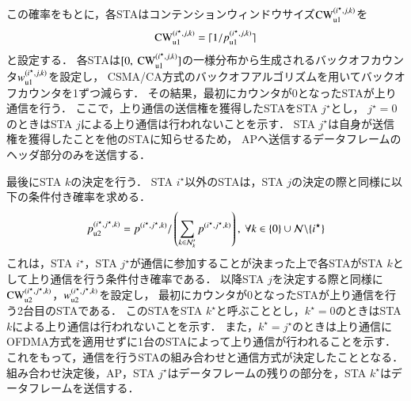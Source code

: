 \documentclass[master]{kuisthesis}		%
\newcommand{\mthnk}{{\mathcal N}'_k}
\begin{document}
			この確率をもとに，各STAはコンテンションウィンドウサイズ${\rm CW}^{(i^{\star},j,k)}_{\rm u1}$を
			\begin{equation}
				{\rm CW}^{(i^{\star},j,k)}_{\rm u1} = \lceil 1/p_{\rm u1}^{(i^{\star},j,k)} \rceil
			\end{equation}
			と設定する．
			各STAは$[0,\ {\rm CW}^{(i^{\star},j,k)}_{\rm u1}]$の一様分布から生成されるバックオフカウンタ$w_{\rm u1}^{(i^{\star},j,k)}$を設定し，
			CSMA/CA方式のバックオフアルゴリズムを用いてバックオフカウンタを1ずつ減らす．
			その結果，最初にカウンタが0となったSTAが上り通信を行う．
			ここで，上り通信の送信権を獲得したSTAをSTA $j^{\star}$とし，
			$j^{\star}=0$のときはSTA $j$による上り通信は行われないことを示す．
			STA $j^{\star}$は自身が送信権を獲得したことを他のSTAに知らせるため，
			APへ送信するデータフレームのヘッダ部分のみを送信する．
			\par
			最後にSTA $k$の決定を行う．
			STA $i^{\star}$以外のSTAは，STA $j$の決定の際と同様に以下の条件付き確率を求める．
			\begin{align}
				p_{\rm u2}^{(i^{\star},j^{\star},k)}=p^{(i^{\star},j^{\star},k)} / \left(\sum_{k\in\mthnk} p^{(i^{\star},j^{\star},k)}\right),\ \forall k \in \{0\}\cup{\mathcal N}\backslash \{i^{\star}\}
			\end{align}
			これは，STA $i^{\star}$，STA $j^{\star}$が通信に参加することが決まった上で各STAがSTA $k$として上り通信を行う条件付き確率である．
			以降STA $j$を決定する際と同様に${\rm CW}^{(i^{\star},j^{\star},k)}_{\rm u2}$，$w_{\rm u2}^{(i^{\star},j^{\star},k)}$を設定し，
			最初にカウンタが0となったSTAが上り通信を行う2台目のSTAである．
			このSTAをSTA $k^{\star}$と呼ぶこととし，$k^{\star}=0$のときはSTA $k$による上り通信は行われないことを示す．
			また，$k^{\star}=j^{\star}$のときは上り通信にOFDMA方式を適用せずに1台のSTAによって上り通信が行われることを示す．
			これをもって，通信を行うSTAの組み合わせと通信方式が決定したこととなる．
			組み合わせ決定後，AP，STA $j^{\star}$はデータフレームの残りの部分を，STA $k^{\star}$はデータフレームを送信する．
\end{document}
